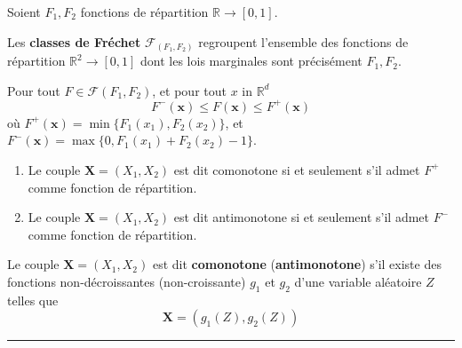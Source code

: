 \begin{f}
Soient $F_1,F_2$ fonctions de répartition $\mathbb{R}\rightarrow [0,1]$.

Les \textbf{classes de Fréchet} $\mathcal{F}_{(F_1,F_2)}$ regroupent l'ensemble des fonctions de répartition $\mathbb{R}^2\rightarrow [0,1]$
dont les lois marginales sont précisément  $F_1,F_2$.
	
Pour tout $F \in \mathcal{F} (F_1,F_2)$, et pour tout $x$ in $\mathbb{R}^d$
$$
F^-(\boldsymbol{x})\leq F (\boldsymbol{x})\leq F^+(\boldsymbol{x})
$$
où $F^+(\boldsymbol{x}) = \min \{F_1(x_1),F_2(x_2)\}$, et 
$F^-(\boldsymbol{x}) = \max\{0,F_1(x_1) +F_2(x_2)-1\}$.



\begin{enumerate}
	\item Le couple $\boldsymbol{X}=(X_1,X_2)$ est dit comonotone si et seulement s'il  admet $F^+$ comme fonction de répartition.
	\item Le couple $\boldsymbol{X}=(X_1,X_2)$ est dit antimonotone si et seulement s'il  admet $F^-$ comme fonction de répartition.
\end{enumerate}

Le couple $\boldsymbol{X}=(X_1,X_2)$ est dit \textbf{comonotone} (\textbf{antimonotone}) s'il existe des fonctions non-décroissantes (non-croissante) $g_1$ et $g_2$ d'une  variable aléatoire $Z$ telles que 
$$
\boldsymbol{X}=(g_1(Z),g_2(Z))
$$
\end{f}
\hrule

